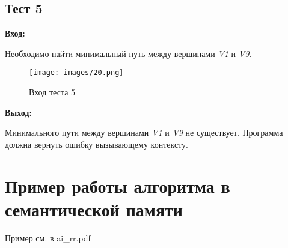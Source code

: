 \subsection{Тест 5}

\textbf{Вход:}

Необходимо найти минимальный путь между вершинами \emph{V1} и \emph{V9}.

\begin{figure}[H]
  \centering
  \texttt{[image: images/20.png]}
  \caption{Вход теста 5}
\end{figure}

\textbf{Выход:}

Минимального пути между вершинами \emph{V1} и \emph{V9} не существует. Программа должна вернуть ошибку вызывающему контексту.

\section{Пример работы алгоритма в семантической памяти}

Пример см. в ai\_rr.pdf
